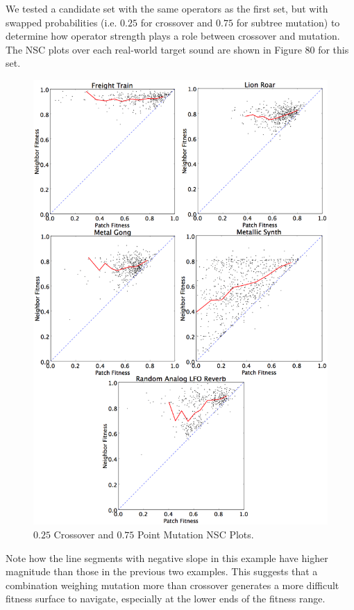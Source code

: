 \documentclass[12pt]{report} 	%
\numberwithin{figure}{chapter}
\numberwithin{table}{chapter}
\numberwithin{equation}{chapter}
\begin{document}
\begin{flushleft}
We tested a candidate set with the same operators as the first set, but with swapped probabilities (i.e. $0.25$ for crossover and $0.75$ for subtree mutation) to determine how operator strength plays a role between crossover and mutation. The NSC plots over each real-world target sound are shown in Figure 80 for this set.
\begin{figure}[h!]
\begin{center}
\includegraphics[scale=0.15]{GOPS_Param4}
\caption[$0.25$ Crossover and $0.75$ point mutation NSC plots]{$0.25$ Crossover and $0.75$ Point Mutation NSC Plots.}
\end{center}
\end{figure}

Note how the line segments with negative slope in this example have higher magnitude than those in the previous two examples. This suggests that a combination weighing mutation more than crossover generates a more difficult fitness surface to navigate, especially at the lower ends of the fitness range.


\end{flushleft}
\end{document}
